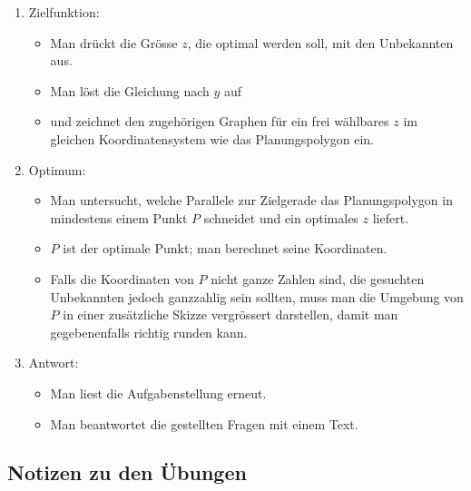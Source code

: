 \documentclass[%
11pt,%
twoside,%
titlepage,%
swissgerman,%
headsepline%
]{scrartcl}
\theoremstyle{definition}
\theoremstyle{plain}
\begin{document}
\begin{enumerate}
			\item Zielfunktion:
			\begin{itemize}
				\item Man drückt die Grösse $z$, die optimal werden soll, mit
				den Unbekannten aus.
				\item Man löst die Gleichung nach $y$ auf
				\item und zeichnet den zugehörigen Graphen für ein frei
				wählbares $z$ im gleichen Koordinatensystem wie das
				Planungspolygon ein.
			\end{itemize}
			\item Optimum:
			\begin{itemize}
				\item Man untersucht, welche Parallele zur Zielgerade das
				Planungspolygon in mindestens einem Punkt $P$ schneidet und ein
				optimales $z$ liefert.
				\item $P$ ist der optimale Punkt; man berechnet seine
				Koordinaten.
				\item Falls die Koordinaten von $P$ nicht ganze Zahlen sind, die
				gesuchten Unbekannten jedoch ganzzahlig sein sollten, muss man
				die Umgebung von $P$ in einer zusätzliche Skizze vergrössert
				darstellen, damit man gegebenenfalls richtig runden kann.
			\end{itemize}
			\item Antwort:
			\begin{itemize}
				\item Man liest die Aufgabenstellung erneut.
				\item Man beantwortet die gestellten Fragen mit einem Text.
			\end{itemize}
			
		\end{enumerate}

\clearpage

\subsection{Notizen zu den Übungen}
\end{document}
